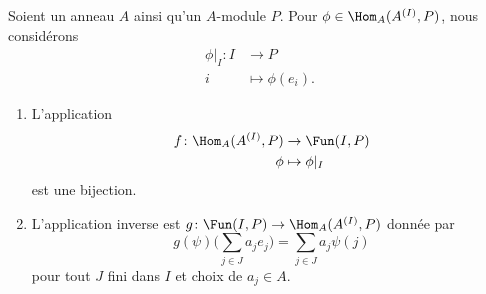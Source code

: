 \begin{theorem}      \label{THOooPDZCooJnHbOd}
	Soient un anneau \( A\) ainsi qu'un \( A\)-module \( P\). Pour \( \phi\in\Hom_A(A^{(I)}, P)\), nous considérons
	\begin{equation}
		\begin{aligned}
			\phi|_I\colon I & \to P              \\
			i               & \mapsto \phi(e_i).
		\end{aligned}
	\end{equation}
	\begin{enumerate}
		\item

		      L'application
		      \begin{equation}
			      \begin{aligned}
				      f\colon \Hom_A(A^{(I)},P) & \to \Fun(I,P)   \\
				      \phi                      & \mapsto \phi|_I
			      \end{aligned}
		      \end{equation}
		      est une bijection.
		\item
		      L'application inverse est \( g\colon \Fun(I,P)\to \Hom_A(A^{(I)},P) \) donnée par
		      \begin{equation}
			      g(\psi)\big( \sum_{j\in J}a_je_j \big)=\sum_{j\in J}a_j\psi(j)
		      \end{equation}
		      pour tout \( J\) fini dans \( I\) et choix de \( a_j\in A\).
	\end{enumerate}
\end{theorem}

